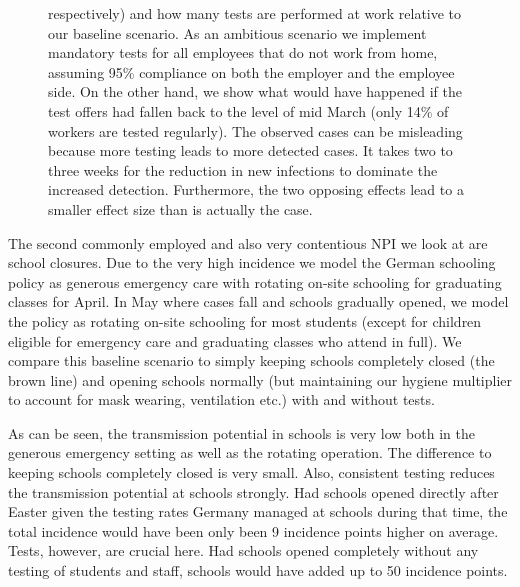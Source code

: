 \begin{figure}[ht]
{        respectively) and how many tests are performed at work relative to our baseline
        scenario. As an ambitious scenario we implement mandatory tests for all employees that
        do not work from home, assuming 95\% compliance on both the employer and the employee
        side. On the other hand, we show what would have happened if the test offers had
        fallen back to the level of mid March (only 14\% of workers are tested regularly). The
        observed cases can be misleading because more testing leads to more detected cases. It
        takes two to three weeks for the reduction in new infections to dominate the increased
        detection. Furthermore, the two opposing effects lead to a smaller effect size than is
        actually the case.}
\end{figure}


\FloatBarrier

The second commonly employed and also very contentious NPI we look at are school
closures. Due to the very high incidence we model the German schooling policy as
generous emergency care with rotating on-site schooling for graduating classes for
April. In May where cases fall and schools gradually opened, we model the policy as
rotating on-site schooling for most students (except for children eligible for emergency
care and graduating classes who attend in full). We compare this baseline scenario to
simply keeping schools completely closed (the brown line) and opening schools normally
(but maintaining our hygiene multiplier to account for mask wearing, ventilation etc.)
with and without tests.

As can be seen, the transmission potential in schools is very low both in the generous
emergency setting as well as the rotating operation. The difference to keeping schools
completely closed is very small. Also, consistent testing reduces the transmission
potential at schools strongly. Had schools opened directly after Easter given the
testing rates Germany managed at schools during that time, the total incidence would
have been only been 9 incidence points higher on average. Tests, however, are crucial
here. Had schools opened completely without any testing of students and staff, schools
would have added up to 50 incidence points.


